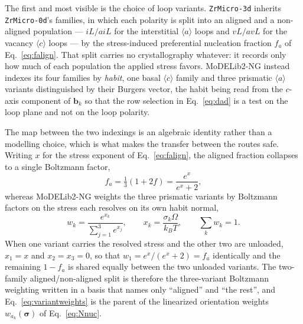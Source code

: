 \documentclass{article}
\newcommand{\aloop}{\ensuremath{\langle a\rangle}}
\newcommand{\cloop}{\ensuremath{\langle c\rangle}}
\newcommand{\ZrM}{\texttt{ZrMicro-3d}}
\newcommand{\ZrOd}{\texttt{ZrMicro-0d}}
\newcommand{\MoDNG}{\textsf{MoDELib2-NG}}
\begin{document}
The first and most visible is the choice of loop variants. {\ZrM} inherits
{\ZrOd}'s families, in which each polarity is split into an aligned and a
non-aligned population --- $iL/aiL$ for the interstitial \aloop{} loops and
$vL/avL$ for the vacancy \cloop{} loops --- by the stress-induced preferential
nucleation fraction $f_a$ of Eq.~\eqref{eq:falign}. That split carries no
crystallography whatever: it records only how much of each population the applied
stress favors. {\MoDNG} instead indexes its four families by \emph{habit}, one
basal \cloop{} family and three prismatic \aloop{} variants distinguished by their
Burgers vector, the habit being read from the $c$-axis component of $\bm b_k$ so
that the row selection in Eq.~\eqref{eq:dad} is a test on the loop plane and not on
the loop polarity.

The map between the two indexings is an algebraic identity rather than a modelling
choice, which is what makes the transfer between the routes safe. Writing $x$ for
the stress exponent of Eq.~\eqref{eq:falign}, the aligned fraction collapses to a
single Boltzmann factor,
\begin{equation}
f_a=\tfrac13(1+2f)=\frac{e^{x}}{e^{x}+2},
\label{eq:falign_boltz}
\end{equation}
whereas {\MoDNG} weights the three prismatic variants by Boltzmann factors on the
stress each resolves on its own habit normal,
\begin{equation}
w_k=\frac{e^{x_k}}{\sum_{j=1}^{3}e^{x_j}},\qquad
x_k=\frac{\sigma_k\Omega}{k_BT},\qquad \sum_{k}w_k=1 .
\label{eq:variantweights}
\end{equation}
When one variant carries the resolved stress and the other two are unloaded,
$x_1=x$ and $x_2=x_3=0$, so that $w_1=e^{x}/(e^{x}+2)=f_a$ identically and the
remaining $1-f_a$ is shared equally between the two unloaded variants. The
two-family aligned/non-aligned split is therefore the three-variant Boltzmann
weighting written in a basis that names only ``aligned'' and ``the rest'', and
Eq.~\eqref{eq:variantweights} is the parent of the linearized orientation weights
$w_{a_k}(\bm\sigma)$ of Eq.~\eqref{eq:Nnuc}.
\end{document}

